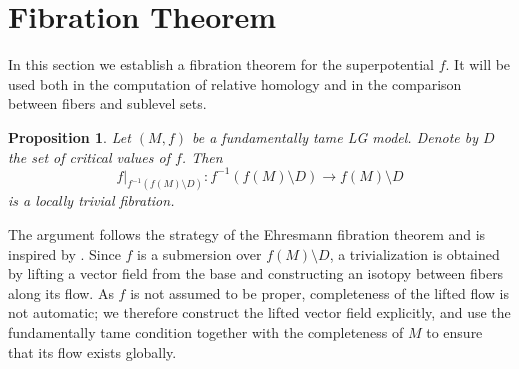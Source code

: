 \documentclass[11pt]{amsart}
\theoremstyle{plain}
\newtheorem{proposition}[theorem]{Proposition}
\theoremstyle{definition}
\theoremstyle{remark}
\numberwithin{equation}{section}
\begin{document}
\section{Fibration Theorem}\label{sec:fibration}

In this section we establish a fibration theorem for the superpotential $f$.
It will be used both in the computation of relative homology and in the comparison between fibers and sublevel sets.

\begin{proposition}\label{prop:fibration}
    Let $(M,f)$ be a fundamentally tame LG model.
    Denote by $D$ the set of critical values of $f$.
    Then
    \begin{equation}
        f|_{f^{-1}(f(M)\setminus D)} : f^{-1}(f(M) \setminus D) \to f(M) \setminus D
    \end{equation}
    is a locally trivial fibration.
\end{proposition}

The argument follows the strategy of the Ehresmann fibration theorem and is inspired by \cite[Lemma 4.3]{Broughton1988}.
Since $f$ is a submersion over $f(M) \setminus D$, a trivialization is obtained by lifting a vector field from the base and constructing an isotopy between fibers along its flow.
As $f$ is not assumed to be proper, completeness of the lifted flow is not automatic; we therefore construct the lifted vector field explicitly, and use the fundamentally tame condition together with the completeness of $M$ to ensure that its flow exists globally.
\end{document}
